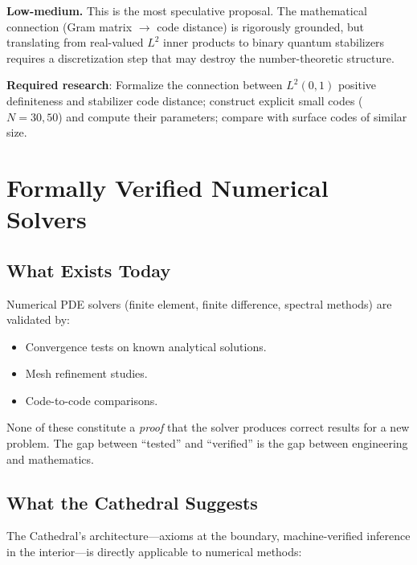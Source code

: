 \documentclass[11pt,a4paper]{article}
\begin{document}
\textbf{Low-medium.} This is the most speculative proposal. The
mathematical connection (Gram matrix $\to$ code distance) is
rigorously grounded, but translating from real-valued $L^2$
inner products to binary quantum stabilizers requires a
discretization step that may destroy the number-theoretic structure.

\textbf{Required research}: Formalize the connection between
$L^2(0,1)$ positive definiteness and stabilizer code distance;
construct explicit small codes ($N = 30, 50$) and compute their
parameters; compare with surface codes of similar size.

\section{Formally Verified Numerical Solvers}
\label{sec:verified}

\subsection{What Exists Today}

Numerical PDE solvers (finite element, finite difference, spectral
methods) are validated by:
\begin{itemize}
  \item Convergence tests on known analytical solutions.
  \item Mesh refinement studies.
  \item Code-to-code comparisons.
\end{itemize}

None of these constitute a \emph{proof} that the solver produces
correct results for a new problem. The gap between ``tested'' and
``verified'' is the gap between engineering and mathematics.

\subsection{What the Cathedral Suggests}

The Cathedral's architecture---axioms at the boundary, machine-verified
inference in the interior---is directly applicable to numerical
methods:
\end{document}

